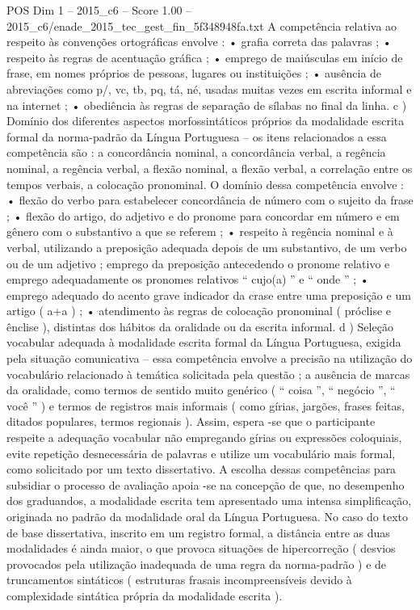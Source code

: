 \begin{textsample}{POS Dim 1 – 2015\_c6 – Score 1.00 – 2015\_c6/enade\_2015\_tec\_gest\_fin\_5f348948fa.txt}
A competência relativa ao respeito às convenções ortográficas envolve : • grafia correta das palavras ; • respeito às regras de acentuação gráfica ; • emprego de maiúsculas em início de frase, em nomes próprios de pessoas, lugares ou instituições ; • ausência de abreviações como p/, vc, tb, pq, tá, né, usadas muitas vezes em escrita informal e na internet ; • obediência às regras de separação de sílabas no final da linha. c ) Domínio dos diferentes aspectos morfossintáticos próprios da modalidade escrita formal da norma-padrão da Língua Portuguesa – os itens relacionados a essa competência são : a concordância nominal, a concordância verbal, a regência nominal, a regência verbal, a flexão nominal, a flexão verbal, a correlação entre os tempos verbais, a colocação pronominal.
O domínio dessa competência envolve : • flexão do verbo para estabelecer concordância de número com o sujeito da frase ; • flexão do artigo, do adjetivo e do pronome para concordar em número e em gênero com o substantivo a que se referem ; • respeito à regência nominal e à verbal, utilizando a preposição adequada depois de um substantivo, de um verbo ou de um adjetivo ; emprego da preposição antecedendo o pronome relativo e emprego adequadamente os pronomes relativos “ cujo(a) ” e “ onde ” ; • emprego adequado do acento grave indicador da crase entre uma preposição e um artigo ( a+a ) ; • atendimento às regras de colocação pronominal ( próclise e ênclise ), distintas dos hábitos da oralidade ou da escrita informal. d ) Seleção vocabular adequada à modalidade escrita formal da Língua Portuguesa, exigida pela situação comunicativa – essa competência envolve a precisão na utilização do vocabulário relacionado à temática solicitada pela questão ; a ausência de marcas da oralidade, como termos de sentido muito genérico ( “ coisa ”, “ negócio ”, “ você ” ) e termos de registros mais informais ( como gírias, jargões, frases feitas, ditados populares, termos regionais ).
Assim, espera -se que o participante respeite a adequação vocabular não empregando gírias ou expressões coloquiais, evite repetição desnecessária de palavras e utilize um vocabulário mais formal, como solicitado por um texto dissertativo.
A escolha dessas competências para subsidiar o processo de avaliação apoia -se na concepção de que, no desempenho dos graduandos, a modalidade escrita tem apresentado uma intensa simplificação, originada no padrão da modalidade oral da Língua Portuguesa.
No caso do texto de base dissertativa, inscrito em um registro formal, a distância entre as duas modalidades é ainda maior, o que provoca situações de hipercorreção ( desvios provocados pela utilização inadequada de uma regra da norma-padrão ) e de truncamentos sintáticos ( estruturas frasais incompreensíveis devido à complexidade sintática própria da modalidade escrita ).

\end{textsample}
